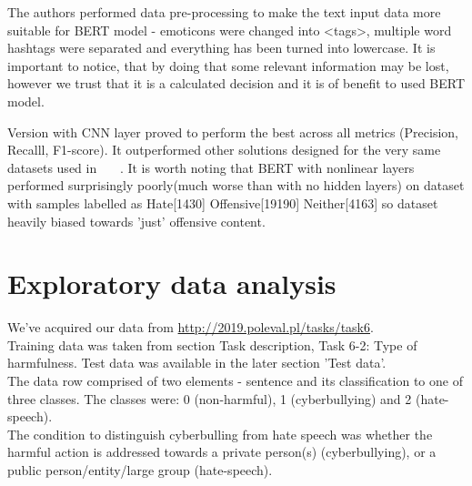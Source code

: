 \documentclass[a4paper]{article}
\begin{document}
\par
The authors performed data pre-processing to make the text input data more suitable for BERT model - emoticons were changed into <tags>, multiple word hashtags were separated and everything has been turned into lowercase. It is important to notice, that by doing that some relevant information may be lost, however we trust that it is a calculated decision and it is of benefit to used BERT model.
\par
Version with CNN layer proved to perform the best across all metrics (Precision, Recalll, F1-score). It outperformed other solutions designed for the very same datasets used in  ~\cite{ref1}~\cite{ref2}~\cite{ref3}. It is worth noting that BERT with nonlinear layers performed surprisingly poorly(much worse than with no hidden layers) on dataset with samples labelled as Hate[1430] Offensive[19190] Neither[4163] so dataset heavily biased towards 'just' offensive content.

\newpage
\section{Exploratory data analysis}
We've acquired our data from \url{http://2019.poleval.pl/tasks/task6}. \\
Training data was taken from section Task description, Task 6-2: Type of harmfulness. Test data was available in the later section 'Test data'. \\

The data row comprised of two elements - sentence and its classification to one of three classes. The classes were: 0 (non-harmful), 1 (cyberbullying) and 2 (hate-speech). \\

The condition to distinguish cyberbulling from hate speech was whether the harmful action is addressed towards a private person(s) (cyberbullying), or a public person/entity/large group (hate-speech).
\end{document}
